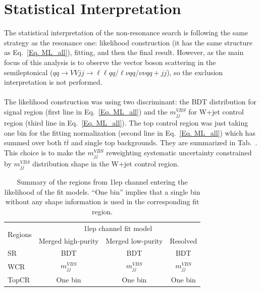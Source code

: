 \section{Statistical Interpretation}
The statistical interpretation of the non-resonance search is following the same strategy as the resonance one: likelihood construction (it has the same structure as Eq.~\ref{Eq. ML_all}), fitting, and then the final result. However, as the main focus of this analysis is to observe the vector boson scattering in the semileptonical ($qq\to VVjj \to \ell\ell qq/\ell\nu qq/\nu\nu qq +jj$), so the exclusion interpretation is not performed. 
\\
\\The likelihood construction was using two discriminant: the BDT distribution for signal region (first line in Eq.~\ref{Eq. ML_all}) and the $m^{VBS}_{jj}$ for W+jet control region (third line in Eq.~\ref{Eq. ML_all}). The top control region was just taking one bin for the fitting normalization (second line in Eq.~\ref{Eq. ML_all}) which has summed over both $t\bar{t}$ and single top backgrounds. They are summarized in Tab.~\label{tab:fitregions_1lep}. This choice is to make the $m^{VBS}_{jj}$ reweighting systematic uncertainty constrained by $m^{VBS}_{jj}$ distribution shape in the W+jet control region. 
\begin{table}[htb!]
	\centering
	\begin{tabular}{lccc}
		\toprule\midrule
		\multirow{2}{*}{Regions} & \multicolumn{3}{c}{1lep channel fit model} \\
		\cmidrule{2-4}
		& Merged high-purity & Merged low-purity & Resolved \\
		\midrule
		SR     & BDT & BDT & BDT \\
		WCR    & $m^{VBS}_{jj}$& $m^{VBS}_{jj}$ & $m^{VBS}_{jj}$ \\
		TopCR  & One bin & One bin & One bin \\
		\midrule
		\bottomrule
	\end{tabular}
	\caption{\label{tab:fitregions_1lep} Summary of the regions from 1lep channel entering the likelihood of the fit models. 
		``One bin'' implies that a single bin without any shape information is used in the corresponding fit region.}
\end{table}


